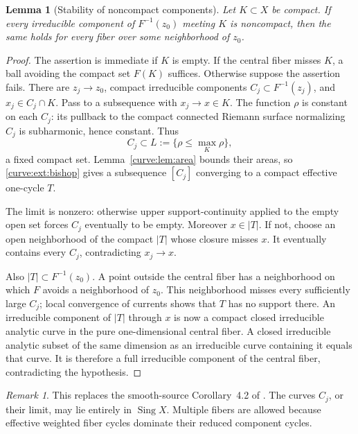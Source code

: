 \documentclass[11pt]{amsart}
\newtheorem{lemma}[theorem]{Lemma}
\theoremstyle{definition}
\theoremstyle{remark}
\newtheorem{remark}[theorem]{Remark}
\numberwithin{equation}{section}
\begin{document}
\begin{lemma}[Stability of noncompact components]\label{curve:lem:stability}
Let \(K\subset X\) be compact. If every irreducible component of
\(F^{-1}(z_0)\) meeting \(K\) is noncompact, then the same holds
for every fiber over some neighborhood of \(z_0\).
\end{lemma}
\begin{proof}
The assertion is immediate if \(K\) is empty. If the central fiber
misses \(K\), a ball avoiding the compact set \(F(K)\) suffices.
Otherwise suppose the assertion fails. There are \(z_j\to z_0\),
compact irreducible components \(C_j\subset F^{-1}(z_j)\), and
\(x_j\in C_j\cap K\). Pass to a subsequence with \(x_j\to x\in K\).
The function \(\rho\) is constant on each \(C_j\):
its pullback to the compact connected Riemann surface normalizing
\(C_j\) is subharmonic, hence constant. Thus
\[
 C_j\subset L:=\{\rho\leq\max_K\rho\},
\]
a fixed compact set.
Lemma~\ref{curve:lem:area} bounds their areas, so \ref{curve:ext:bishop}
gives a subsequence \([C_j]\) converging to a compact effective
one-cycle \(T\).

The limit is nonzero: otherwise upper support-continuity applied
to the empty open set forces \(C_j\) eventually to be empty.
Moreover \(x\in|T|\). If not, choose an open neighborhood of the
compact \(|T|\) whose closure misses \(x\). It eventually contains
every \(C_j\), contradicting \(x_j\to x\).

Also \(|T|\subset F^{-1}(z_0)\). A point outside the central fiber
has a neighborhood on which \(F\) avoids a neighborhood of \(z_0\).
This neighborhood misses every sufficiently large \(C_j\);
local convergence of currents shows that \(T\) has no support there.
An irreducible component of \(|T|\) through \(x\) is now a compact
closed irreducible analytic curve in the pure one-dimensional
central fiber. A closed irreducible analytic subset of the same
dimension as an irreducible curve containing it equals that curve.
It is therefore a full irreducible component of the central fiber,
contradicting the hypothesis.
\end{proof}

\begin{remark}
This replaces the smooth-source Corollary~4.2 of
\cite[p.~462]{VijituForum2022}.
The curves \(C_j\), or their limit, may lie entirely in
\(\operatorname{Sing}X\).
Multiple fibers are allowed because effective weighted fiber cycles
dominate their reduced component cycles.
\end{remark}
\end{document}
